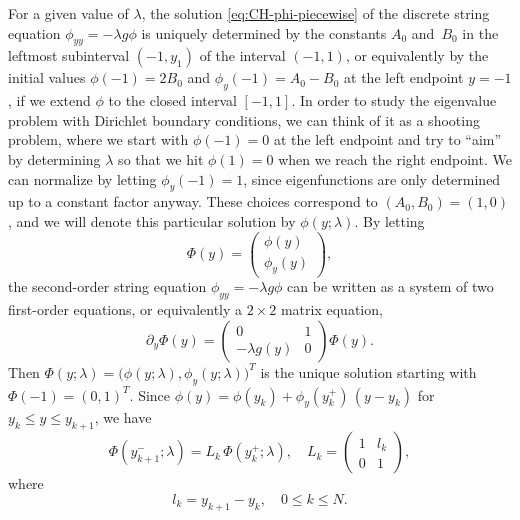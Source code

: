 \documentclass[10pt,a4paper]{article} \pdfoutput=1 
\begin{document}
For a given value of $\lambda$,
the solution \eqref{eq:CH-phi-piecewise}
of the discrete string equation $\phi_{yy} = -\lambda g \phi$
is uniquely determined by the constants $A_0$ and~$B_0$
in the leftmost subinterval $(-1,y_1)$ of the interval $(-1,1)$,
or equivalently by the initial values $\phi(-1) = 2B_0$ and $\phi_y(-1) = A_0 - B_0$
at the left endpoint $y=-1$, if we extend $\phi$ to the closed interval $[-1,1]$.
In order to study the eigenvalue problem with Dirichlet boundary conditions,
we can think of it as a shooting problem, where we start with $\phi(-1) = 0$
at the left endpoint
and try to ``aim'' by determining $\lambda$ so that we hit $\phi(1)=0$
when we reach the right endpoint.
We can normalize by letting $\phi_y(-1)=1$,
since eigenfunctions are only determined up to a constant factor anyway.
These choices correspond to $(A_0,B_0)=(1,0)$,
and we will denote this particular solution by $\phi(y;\lambda)$.
By letting
\begin{equation}
  \Phi(y) = \begin{pmatrix} \phi(y) \\ \phi_y(y) \end{pmatrix}
  ,
\end{equation}
the second-order string equation $\phi_{yy} = -\lambda g \phi$
can be written as a system of two first-order equations,
or equivalently a $2 \times 2$ matrix equation,
\begin{equation}
  \label{eq:CH-string-equation-matrix-form}
  \partial_y \Phi(y) =
  \begin{pmatrix}
    0 & 1 \\
    - \lambda g(y) & 0
  \end{pmatrix}
  \Phi(y)
  .
\end{equation}
Then $\Phi(y;\lambda) = \bigl( \phi(y;\lambda), \phi_y(y;\lambda) \bigr)^T$
is the unique solution starting with $\Phi(-1) = (0,1)^T$.
Since $\phi(y) = \phi(y_k) + \phi_y(y_k^+) \, (y-y_k)$
for $y_k \le y \le y_{k+1}$, we have
\begin{equation}
  \label{eq:CH-jump-matrix-Lk}
  \Phi(y_{k+1}^-;\lambda)
  = L_k \, \Phi(y_{k}^+;\lambda)
  ,\quad
  L_k =
  \begin{pmatrix}
    1 & l_k \\
    0 & 1
  \end{pmatrix}
  ,
\end{equation}
where
\begin{equation}
  \label{eq:CH-lk}
  l_k = y_{k+1} - y_k
  ,\quad
  0 \le k \le N
  .
\end{equation}
\end{document}
